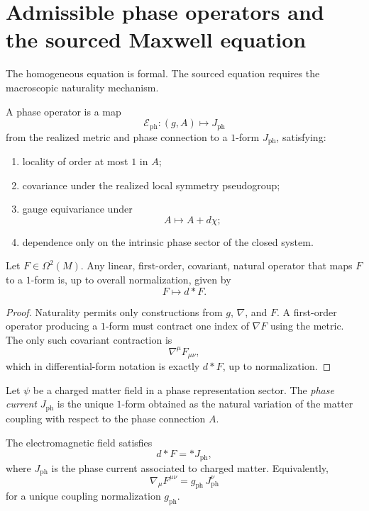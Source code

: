\section{Admissible phase operators and the sourced Maxwell equation}
\label{sec:em-sourced-maxwell}
The homogeneous equation is formal.
The sourced equation requires the macroscopic naturality mechanism.
\begin{definition}
	A phase operator is a map
	\[
		\mathcal E_{\mathrm{ph}}:(g,A)\mapsto J_{\mathrm{ph}}
	\]
	from the realized metric and phase connection to a \(1\)-form
	\(J_{\mathrm{ph}}\),
	satisfying:
	\begin{enumerate}
		\item locality of order at most \(1\) in \(A\);
		\item covariance under the realized local symmetry pseudogroup;
		\item gauge equivariance under
		      \[
			      A\mapsto A+d\chi;
		      \]
		\item dependence only on the intrinsic phase sector of the closed
		      system.
	\end{enumerate}
\end{definition}
\begin{lemma}
	\label{lem:em-natural-operator}
	Let \(F\in\Omega^2(M)\).
	Any linear, first-order, covariant, natural operator that maps \(F\) to
	a \(1\)-form is, up to overall normalization, given by
	\[
		F\mapsto d{*}F.
	\]
\end{lemma}
\begin{proof}
	Naturality permits only constructions from \(g\), \(\nabla\), and \(F\).
	A first-order operator producing a \(1\)-form must contract one index
	of \(\nabla F\) using the metric.
	The only such covariant contraction is
	\[
		\nabla^\mu F_{\mu\nu},
	\]
	which in differential-form notation is exactly \(d{*}F\), up to
	normalization.
\end{proof}
\begin{definition}
	Let \(\psi\) be a charged matter field in a phase representation sector.
	The \emph{phase current} \(J_{\mathrm{ph}}\) is the unique \(1\)-form
	obtained as the natural variation of the matter coupling with respect to
	the phase connection \(A\).
\end{definition}
\begin{theorem}
	\label{thm:em-sourced-maxwell}
	The electromagnetic field satisfies
	\[
		d{*}F = {*}J_{\mathrm{ph}},
	\]
	where \(J_{\mathrm{ph}}\) is the phase current associated to charged
	matter.
	Equivalently,
	\[
		\nabla_\mu F^{\mu\nu}=g_{\mathrm{ph}}\,J_{\mathrm{ph}}^\nu
	\]
	for a unique coupling normalization \(g_{\mathrm{ph}}\).
\end{theorem}
